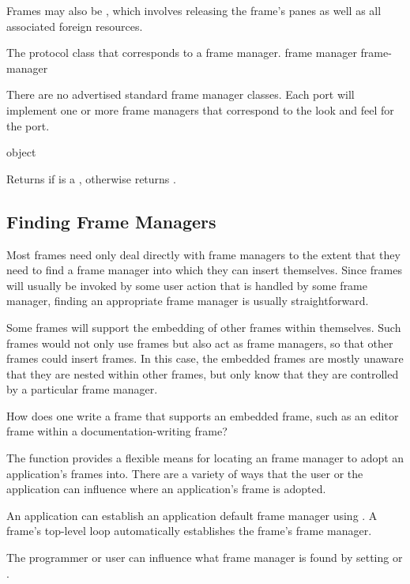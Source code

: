 {Frames may also be , which involves releasing the frame's
panes as well as all associated foreign resources.


The protocol class that corresponds to a frame manager.
 {frame manager} {frame-manager}

There are no advertised standard frame manager classes.  Each port will
implement one or more frame managers that correspond to the look and feel for
the port.

 {object}

Returns  if  is a , otherwise returns
.


\subsection {Finding Frame Managers}

Most frames need only deal directly with frame managers to the extent that they
need to find a frame manager into which they can insert themselves.  Since
frames will usually be invoked by some user action that is handled by some frame
manager, finding an appropriate frame manager is usually straightforward.

Some frames will support the embedding of other frames within themselves.  Such
frames would not only use frames but also act as frame managers, so that other
frames could insert frames.  In this case, the embedded frames are mostly
unaware that they are nested within other frames, but only know that they are
controlled by a particular frame manager.  

 {How does one write a frame that supports an embedded frame, such
as an editor frame within a documentation-writing frame?}

The  function provides a flexible means for locating an
frame manager to adopt an application's frames into.  There are a variety of
ways that the user or the application can influence where an application's frame
is adopted.

An application can establish an application default frame manager using
.  A frame's top-level loop automatically establishes the
frame's frame manager.

The programmer or user can influence what frame manager is found by setting
 or .

}
